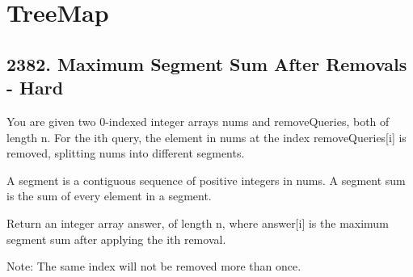 \documentclass[9pt, b5paaper]{book}
\begin{document}
\chapter{TreeMap}
\label{sec-6}
\section{2382. Maximum Segment Sum After Removals - Hard}
\label{sec-6-1}
You are given two 0-indexed integer arrays nums and removeQueries, both of length n. For the ith query, the element in nums at the index removeQueries[i] is removed, splitting nums into different segments.

A segment is a contiguous sequence of positive integers in nums. A segment sum is the sum of every element in a segment.

Return an integer array answer, of length n, where answer[i] is the maximum segment sum after applying the ith removal.

Note: The same index will not be removed more than once.
\end{document}
